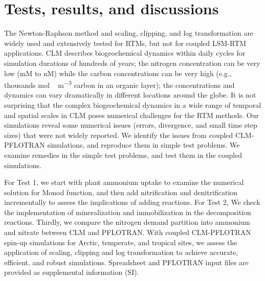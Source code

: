 \documentclass[gmd, manuscript]{copernicus}
\begin{document}
\section{Tests, results, and discussions}
The Newton-Raphson method and scaling, clipping, and log transformation are
widely used and extensively tested for RTMs, but not for coupled LSM-RTM applications. CLM
describes biogeochemical dynamics within daily cycles for simulation durations
of hundreds of years; the nitrogen concentration can be very low (\unit{mM} to
\unit{nM}) while the carbon concentrations can be very high (e.g., thousands
\unit{mol\,m^{-3}} carbon in an organic layer); the concentrations and dynamics
can vary dramatically in different locations around the globe. It is not
surprising that the complex biogeochemical dynamics in a wide range of temporal
and spatial scales in CLM poses numerical challenges for the RTM methods. Our
simulations reveal some numerical issues (errors, divergence, and small time
step sizes) that were not widely reported. We identify the issues from coupled
CLM-PFLOTRAN simulations, and reproduce them in simple test problems. We
examine remedies in the simple test problems, and test them in the coupled
simulations. 

For Test 1, we start with plant ammonium uptake to examine the numerical solution
for Monod function, and then add nitrification and denitrification
incrementally to assess the implications of adding reactions. For Test 2, We
check the implementation of mineralization and immobilization in the
decomposition reactions. Thirdly, we compare the nitrogen demand partition into
ammonium and nitrate between CLM and PFLOTRAN. With coupled CLM-PFLOTRAN
spin-up simulations for Arctic, temperate, and tropical sites, we assess the
application of scaling, clipping and log transformation to achieve accurate,
efficient, and robust simulations. Spreadsheet and PFLOTRAN input files are
provided as supplemental information (SI).
\end{document}
